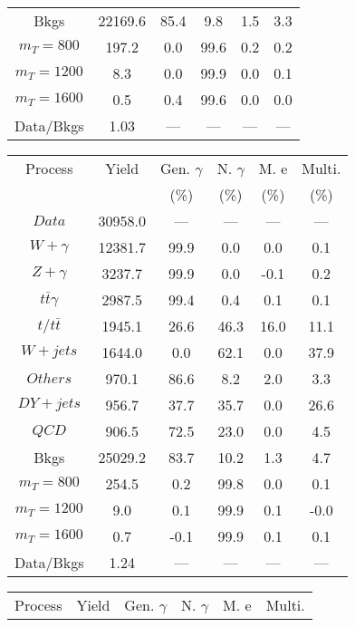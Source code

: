 \begin{figure}
\begin{minipage}[c]{0.32\textwidth}
{\begin{tabular}{cccccc}
Bkgs &  22169.6 &  85.4 &  9.8 &  1.5 &  3.3\\
$ m_{T} = 800 $ &  197.2 &  0.0 &  99.6 &  0.2 &  0.2\\
$ m_{T} = 1200 $ &  8.3 &  0.0 &  99.9 &  0.0 &  0.1\\
$ m_{T} = 1600 $ &  0.5 &  0.4 &  99.6 &  0.0 &  0.0\\
Data/Bkgs &  1.03 &  --- &  --- &  --- &  ---\\
\hline
\end{tabular}
}
\end{minipage}
\begin{minipage}[c]{0.32\textwidth}
\centering
\tiny{
\begin{tabular}{cccccc}
\hline
Process & Yield & Gen. $\gamma$ & N. $\gamma$ & M. e & Multi. \\
 &  & (\%) & (\%) & (\%) & (\%)  \\
\hline
                                                                      $ Data $ &  30958.0 &  --- &  --- &  --- &  ---\\
$ W+\gamma $ &  12381.7 &  99.9 &  0.0 &  0.0 &  0.1\\
$ Z+\gamma $ &  3237.7 &  99.9 &  0.0 &  -0.1 &  0.2\\
$ t\bar{t}\gamma $ &  2987.5 &  99.4 &  0.4 &  0.1 &  0.1\\
$ t/t\bar{t} $ &  1945.1 &  26.6 &  46.3 &  16.0 &  11.1\\
$ W+jets $ &  1644.0 &  0.0 &  62.1 &  0.0 &  37.9\\
$ Others $ &  970.1 &  86.6 &  8.2 &  2.0 &  3.3\\
$ DY+jets $ &  956.7 &  37.7 &  35.7 &  0.0 &  26.6\\
$ QCD $ &  906.5 &  72.5 &  23.0 &  0.0 &  4.5\\
Bkgs &  25029.2 &  83.7 &  10.2 &  1.3 &  4.7\\
$ m_{T} = 800 $ &  254.5 &  0.2 &  99.8 &  0.0 &  0.1\\
$ m_{T} = 1200 $ &  9.0 &  0.1 &  99.9 &  0.1 &  -0.0\\
$ m_{T} = 1600 $ &  0.7 &  -0.1 &  99.9 &  0.1 &  0.1\\
Data/Bkgs &  1.24 &  --- &  --- &  --- &  ---\\
\hline
\end{tabular}
}
\end{minipage}
\begin{minipage}[c]{0.32\textwidth}
\centering
\tiny{
\begin{tabular}{cccccc}
\hline
Process & Yield & Gen. $\gamma$ & N. $\gamma$ & M. e & Multi. \\

\end{tabular}}
\end{minipage}
\end{figure}
